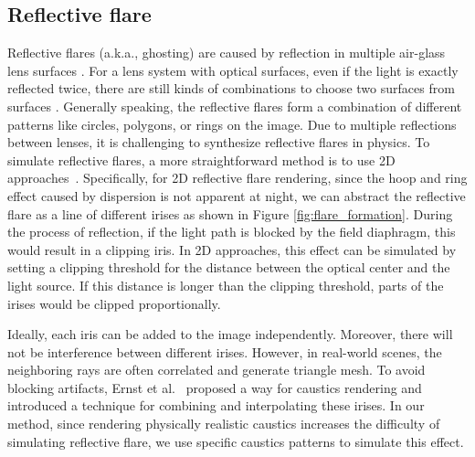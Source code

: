 \documentclass{article}
\newcommand{\yuekun}[1]{{\color{black}{#1}}}
\begin{document}
\vspace{-2mm}
\subsection{Reflective flare} \label{reflective flare}
\vspace{-1mm}
Reflective flares (a.k.a., ghosting) are caused by reflection in multiple air-glass lens surfaces \cite{flare_simulation1}. 
For a lens system with  optical surfaces, even if the light is exactly reflected twice, there are still  kinds of combinations to choose two surfaces from  surfaces \yuekun{\cite{how_to,flare_simulation1}}. 
Generally speaking, the reflective flares form a combination of different patterns like circles, polygons, or rings on the image. 
Due to multiple reflections between lenses, it is challenging to synthesize reflective flares in physics. 
To simulate reflective flares, a more straightforward method is to use 2D approaches~\cite{flare_simulation2}. 
Specifically, for 2D reflective flare rendering, since the hoop and ring effect caused by dispersion is not apparent at night, we can abstract the reflective flare as a line of different irises as shown in Figure \ref{fig:flare_formation}.
During the process of reflection, if the light path is blocked by the field diaphragm, this would result in a clipping iris. 
In 2D approaches, this effect can be simulated by setting a clipping threshold for the distance between the optical center and the light source. 
If this distance is longer than the clipping threshold, parts of the irises would be clipped proportionally.

Ideally, each iris can be added to the image independently. Moreover, there will not be interference between different irises.
However, in real-world scenes, the neighboring rays are often correlated and generate triangle mesh. 
To avoid blocking artifacts, Ernst et al.~\cite{Ernst2005} proposed a way for caustics rendering and introduced a technique for combining and interpolating these irises. 
In our method, since rendering physically realistic caustics increases the difficulty of simulating reflective flare, we use specific caustics patterns to simulate this effect.
\end{document}
